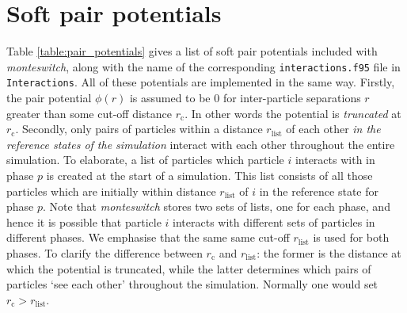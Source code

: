 \documentclass{report}
\begin{document}
\section{Soft pair potentials}\label{section:pair_potentials}
Table \ref{table:pair_potentials} gives a list of soft pair potentials included with \emph{monteswitch}, along with the name 
of the corresponding \texttt{interactions.f95} file in \texttt{Interactions}. All of these potentials are implemented in the same way.
Firstly, the pair potential $\phi(r)$ is assumed to be 0 for inter-particle separations $r$ greater than some cut-off distance $r_{\text{c}}$. In other
words the potential is \emph{truncated} at $r_{\text{c}}$.
Secondly, only pairs of particles within a distance $r_{\text{list}}$ of each other \emph{in the reference states of the simulation} interact
with each other throughout the entire simulation. To elaborate, a list of particles which particle $i$ interacts with in phase $p$ is created at 
the start of a simulation. This list consists of all those particles which are initially within distance $r_{\text{list}}$ of $i$ in the reference
state for phase $p$. Note that \emph{monteswitch} stores two sets of lists, one for each phase, and hence it is possible that particle $i$ interacts
with different sets of particles in different phases. We emphasise that the same same cut-off $r_{\text{list}}$ is used for both phases.
To clarify the difference between $r_{\text{c}}$ and $r_{\text{list}}$: the former is the distance at which the potential is truncated, while
the latter determines which pairs of particles `see each other' throughout the simulation. Normally one would set $r_{\text{c}}>r_{\text{list}}$.
\end{document}
